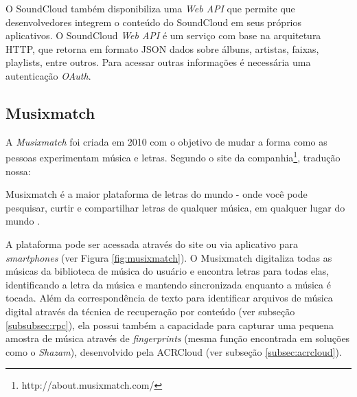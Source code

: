 O SoundCloud também disponibiliza uma \textit{Web API} que permite que desenvolvedores integrem o conteúdo do SoundCloud em seus próprios aplicativos. O SoundCloud \textit{Web API} é um serviço com base na arquitetura HTTP, que retorna em formato JSON dados sobre álbuns, artistas, faixas, playlists, entre outros. Para acessar outras informações é necessária uma autenticação \textit{OAuth}.


\subsection{Musixmatch} \label{subsec:musixmatch}
A \textit{Musixmatch} foi criada em 2010 com o objetivo de mudar a forma como as pessoas experimentam música e letras. Segundo o site da companhia\footnote{http://about.musixmatch.com/}, tradução nossa:

\begin{citacao}
Musixmatch é a maior plataforma de letras do mundo - onde você pode pesquisar, curtir e compartilhar letras de qualquer música, em qualquer lugar do mundo \cite{musixmatch2010}.
\end{citacao}

A plataforma pode ser acessada através do site ou via aplicativo para \textit{smartphones} (ver Figura \ref{fig:musixmatch}). O Musixmatch digitaliza todas as músicas da biblioteca de música do usuário e encontra letras para todas elas, identificando a letra da música e mantendo sincronizada enquanto a música é tocada. Além da correspondência de texto para identificar arquivos de música digital através da técnica de recuperação por conteúdo (ver subseção \ref{subsubsec:rpc}), ela possui também a capacidade para capturar uma pequena amostra de música através de \textit{fingerprints} (mesma função encontrada em soluções como o \textit{Shazam}), desenvolvido pela ACRCloud (ver subseção \ref{subsec:acrcloud}).

